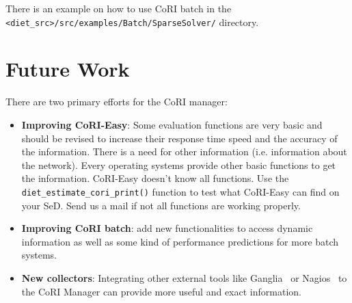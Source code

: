 There is an example on how to use CoRI batch in the\\
\verb!<diet_src>/src/examples/Batch/SparseSolver/! directory.

\section{Future Work}

There are two primary efforts for the CoRI manager:
\begin{itemize}
\item \textbf{Improving CoRI-Easy}: Some evaluation functions are very
  basic and should be revised to increase their response time speed
  and the accuracy of the information.  There is a need for other
  information (i.e. information about the network).  Every operating
  systems provide other basic functions to get the information.
  CoRI-Easy doesn't know all functions. Use the
  \texttt{diet\_estimate\_cori\_print()} function to test what
  CoRI-Easy can find on your SeD. Send us a mail if not  all functions
  are working properly.

\item \textbf{Improving CoRI batch}: add new functionalities to access
dynamic information as well as some kind of performance predictions
for more batch systems.

\item \textbf{New collectors}: Integrating other external tools like
  Ganglia~\cite{Ganglia} or Nagios~\cite{Nagios} to the CoRI Manager
  can provide more useful and exact information.
\end{itemize}

